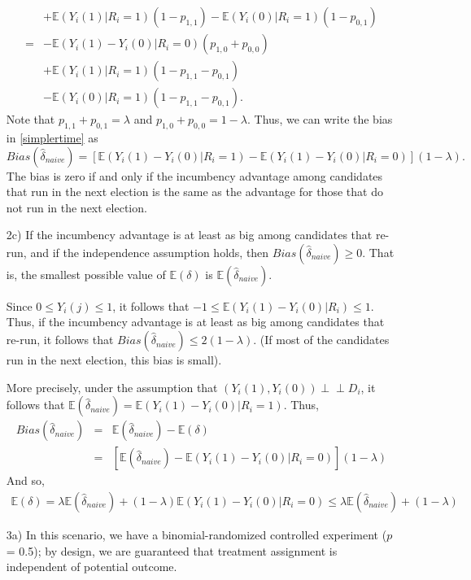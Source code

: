 \documentclass[11pt]{report}
\newcommand{\indep}{\perp\!\!\!\perp}
\newcommand{\E}[0]{\mathbb{E}}
\begin{document}
\begin{itemize}
\begin{align}
		 & + \E(Y_i(1)|  R_i = 1)(1 - p_{1,1}) - \E(Y_i(0)| R_i = 1)(1 - p_{0,1}) \nonumber \\
		 = &- \E(Y_i(1) - Y_i(0)| R_i = 0)(p_{1,0} + p_{0,0}) \nonumber \\
		 & + \E(Y_i(1)| R_i = 1)(1 - p_{1,1} - p_{0,1}) \nonumber \\
		 & - \E(Y_i(0)|R_i = 1)(1 - p_{1,1} - p_{0,1}).
		 \label{simplertime}
	\end{align}
	Note that $p_{1,1} + p_{0,1} = \lambda$ and $p_{1,0} + p_{0,0} = 1 - \lambda$.
	Thus, we can write the bias in \eqref{simplertime} as
	\begin{equation}
		 Bias(\hat \delta_{naive}) = \left [\E(Y_i(1) - Y_i(0)| R_i = 1)- 
		 \E(Y_i(1) - Y_i(0)| R_i = 0)\right ](1-\lambda).
		 \label{dabias}
	\end{equation}
	The bias is zero if and only if
	the incumbency advantage among candidates
	that run in the next election is the same 
	as the advantage for those that do not run in the next election.
\item[2c)]
	If the incumbency advantage is at least as big among candidates that re-run,
	and if the independence assumption holds,
	then $Bias(\hat \delta_{naive}) \geq 0$.  
	That is, the smallest possible value of $\E(\delta)$ is $\E(\hat \delta_{naive})$.
	
	Since $0 \leq Y_i(j) \leq 1$, it follows that $-1 \leq \E(Y_i(1) - Y_i(0)|R_i) \leq 1$.  
	Thus, if the incumbency advantage is at least as big among candidates that re-run,
	it follows that $Bias(\hat \delta_{naive}) \leq 2(1-\lambda).$
	(If most of the candidates run in the next election, this bias is small).
	
	More precisely, under the assumption that $(Y_i(1),Y_i(0)) \indep D_i$,
	it follows that $\E(\hat \delta_{naive}) = \E(Y_i(1) - Y_i(0)| R_i = 1)$.
	Thus, 
	\begin{eqnarray}
	  Bias(\hat \delta_{naive}) &=& \E(\hat \delta_{naive}) - \E(\delta) \nonumber\\
	  &=&\left [\E(\hat \delta_{naive})- \E(Y_i(1) - Y_i(0)| R_i = 0)\right ](1-\lambda)	
	\end{eqnarray}
	And so,
	\begin{eqnarray}
	  \E(\delta) = \lambda\E(\hat \delta_{naive}) + 
	  (1-\lambda)\E(Y_i(1) - Y_i(0)| R_i = 0) \leq \lambda\E(\hat \delta_{naive}) + (1-\lambda)
	\end{eqnarray}
\item[3a)]
	In this scenario, we have a 
	binomial-randomized controlled experiment ($p$ = 0.5);
	by design, we are guaranteed that treatment assignment is 
	independent of potential outcome.
	

\end{itemize}
\end{document}
